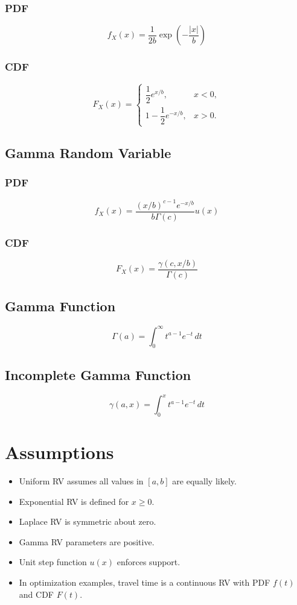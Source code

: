 \documentclass[11pt]{article}
\begin{document}
\subsubsection*{PDF}
\[
f_X(x)=\frac{1}{2b}\exp\!\left(-\frac{|x|}{b}\right)
\]

\subsubsection*{CDF}
\[
F_X(x)=
\begin{cases}
\dfrac12 e^{x/b}, & x<0,\\[6pt]
1-\dfrac12 e^{-x/b}, & x>0.
\end{cases}
\]

\subsection{Gamma Random Variable}

\subsubsection*{PDF}
\[
f_X(x)=\frac{(x/b)^{c-1}e^{-x/b}}{b\Gamma(c)}u(x)
\]

\subsubsection*{CDF}
\[
F_X(x)=\frac{\gamma(c,x/b)}{\Gamma(c)}
\]

\subsection{Gamma Function}

\[
\Gamma(a)=\int_0^\infty t^{a-1}e^{-t}\,dt
\]

\subsection{Incomplete Gamma Function}

\[
\gamma(a,x)=\int_0^x t^{a-1}e^{-t}\,dt
\]

\section{Assumptions}

\begin{itemize}
\item Uniform RV assumes all values in $[a,b]$ are equally likely.
\item Exponential RV is defined for $x\ge 0$.
\item Laplace RV is symmetric about zero.
\item Gamma RV parameters are positive.
\item Unit step function $u(x)$ enforces support.
\item In optimization examples, travel time is a continuous RV with PDF $f(t)$ and CDF $F(t)$.
\end{itemize}
\end{document}

